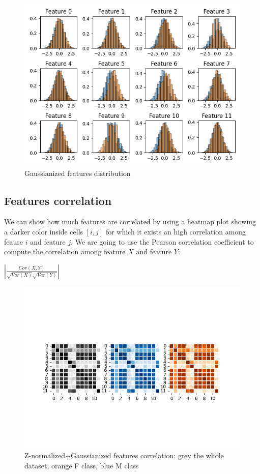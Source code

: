 \documentclass[10pt, a4paper, twocolumn]{article} %
\begin{document}
\begin{figure}[ht!]
	\includegraphics[width=\linewidth]{./Pictures/FeaturesAnalysis/hist_gau.png}
	\caption{Gaussianized features distribution}
	\label{hist_gau} 
\end{figure}

\subsection{Features correlation}
We can show how much features are correlated by using a heatmap plot showing a darker
color inside cells $[i, j]$ for which it exists an high correlation among feaure $i$ and 
feature $j$. We are going to use the Pearson correlation coefficient to compute the
correlation among feature $X$ and feature $Y$:
\begin{center}
	\begin{math}
		|\frac{Cov(X, Y)}{\sqrt{Var(X)}\sqrt{Var(Y)}}|
	\end{math}
\end{center}
\begin{figure}[ht!]
	\includegraphics[width=\linewidth]{./Pictures/FeaturesAnalysis/heatmap_znormgau.png}
	\caption{Z-normalized+Gaussianized features correlation: grey the whole dataset, orange F class, 
	blue M class}
	\label{heatmap} 
\end{figure}
\end{document}
